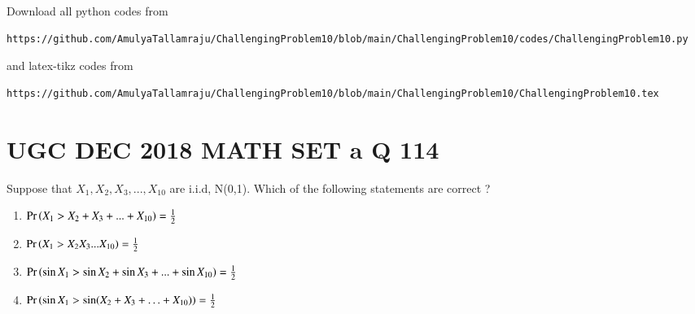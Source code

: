 \documentclass[journal,12pt,twocolumn]{IEEEtran}
\begin{document}
\maketitle
\newpage
\bigskip
\renewcommand{\thefigure}{\theenumi}
\renewcommand{\thetable}{\theenumi}
\newcommand*{\permcomb}[4][0mu]{{{}^{#3}\mkern#1#2_{#4}}}
\newcommand*{\perm}[1][-3mu]{\permcomb[#1]{P}}
\newcommand*{\comb}[1][-1mu]{\permcomb[#1]{C}}
Download all python codes from 
\begin{lstlisting}
https://github.com/AmulyaTallamraju/ChallengingProblem10/blob/main/ChallengingProblem10/codes/ChallengingProblem10.py
\end{lstlisting}
%
and latex-tikz codes from 
%
\begin{lstlisting}
https://github.com/AmulyaTallamraju/ChallengingProblem10/blob/main/ChallengingProblem10/ChallengingProblem10.tex
\end{lstlisting}
\section*{UGC DEC 2018 MATH SET a Q 114}
Suppose that $X_1,X_2,X_3,...,X_{10}$ are i.i.d, N(0,1). Which of the following statements are correct ?
\begin{enumerate}[label = (\Alph*)]
    \item $\Pr\left(X_1>X_2+X_3+...+X_{10}\right)=\frac{1}{2}$
    \item $\Pr\left(X_1>X_2X_3...X_{10}\right)=\frac{1}{2}$
    \item $\Pr\left(\sin{X_1}>\sin{X_2}+\sin{X_3}+...+\sin{X_{10}}\right)=\frac{1}{2}$
    \item $\Pr\left(\sin{X_1}>\sin({X_2+X_3+\ldots+X_{10}})\right)=\frac{1}{2}$
\end{enumerate}
\end{document}
